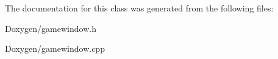The documentation for this class was generated from the following files\-:\begin{DoxyCompactItemize}
\item 
Doxygen/gamewindow.\-h\item 
Doxygen/gamewindow.\-cpp\end{DoxyCompactItemize}
